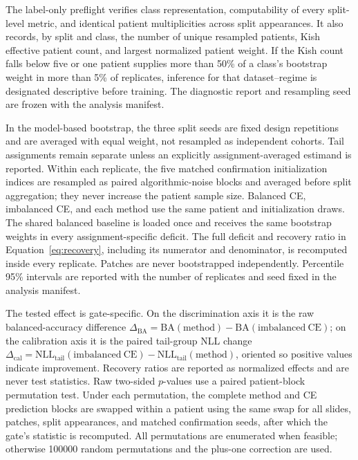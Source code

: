 \documentclass[11pt]{article}
\begin{document}
The label-only preflight verifies class representation, computability of every split-level metric, and identical patient multiplicities across split appearances. It also records, by split and class, the number of unique resampled patients, Kish effective patient count, and largest normalized patient weight. If the Kish count falls below five or one patient supplies more than 50\% of a class's bootstrap weight in more than 5\% of replicates, inference for that dataset--regime is designated descriptive before training. The diagnostic report and resampling seed are frozen with the analysis manifest.

In the model-based bootstrap, the three split seeds are fixed design repetitions and are averaged with equal weight, not resampled as independent cohorts. Tail assignments remain separate unless an explicitly assignment-averaged estimand is reported. Within each replicate, the five matched confirmation initialization indices are resampled as paired algorithmic-noise blocks and averaged before split aggregation; they never increase the patient sample size. Balanced CE, imbalanced CE, and each method use the same patient and initialization draws. The shared balanced baseline is loaded once and receives the same bootstrap weights in every assignment-specific deficit. The full deficit and recovery ratio in Equation~\eqref{eq:recovery}, including its numerator and denominator, is recomputed inside every replicate. Patches are never bootstrapped independently. Percentile 95\% intervals are reported with the number of replicates and seed fixed in the analysis manifest.

The tested effect is gate-specific. On the discrimination axis it is the raw balanced-accuracy difference $\Delta_{\mathrm{BA}}=\mathrm{BA}(\mathrm{method})-\mathrm{BA}(\mathrm{imbalanced\ CE})$; on the calibration axis it is the paired tail-group NLL change $\Delta_{\mathrm{cal}}=\mathrm{NLL}_{\mathrm{tail}}(\mathrm{imbalanced\ CE})-\mathrm{NLL}_{\mathrm{tail}}(\mathrm{method})$, oriented so positive values indicate improvement. Recovery ratios are reported as normalized effects and are never test statistics. Raw two-sided $p$-values use a paired patient-block permutation test. Under each permutation, the complete method and CE prediction blocks are swapped within a patient using the same swap for all slides, patches, split appearances, and matched confirmation seeds, after which the gate's statistic is recomputed. All permutations are enumerated when feasible; otherwise \num{100000} random permutations and the plus-one correction are used.
\end{document}
